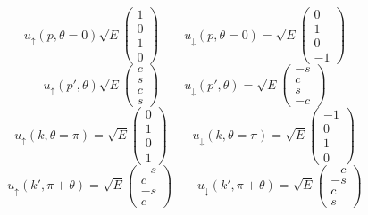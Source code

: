 \begin{equation} 
	u_\uparrow(p,\theta=0) \sqrt{E} \begin{pmatrix}
		1 \\ 0 \\ 1 \\ 0
	\end{pmatrix} \qquad 
	u_\downarrow(p,\theta=0)= \sqrt{E} \begin{pmatrix}
		0 \\ 1 \\ 0 \\ -1
	\end{pmatrix}
\end{equation}
\begin{equation} 
	u_\uparrow(p',\theta) \sqrt{E} \begin{pmatrix}
		c \\ s \\ c \\ s
	\end{pmatrix} \qquad 
	u_\downarrow(p',\theta)= \sqrt{E} \begin{pmatrix}
		-s \\ c \\ s \\ -c
	\end{pmatrix}
\end{equation}
\begin{equation}
	u_\uparrow(k,\theta=\pi) = \sqrt{E} \begin{pmatrix}
		0 \\ 1 \\ 0 \\ 1
	\end{pmatrix}  \qquad 
	u_\downarrow(k,\theta=\pi) = \sqrt{E} \begin{pmatrix}
		-1 \\ 0 \\ 1 \\ 0
	\end{pmatrix} 
\end{equation}
\begin{equation}
	u_\uparrow(k',\pi+\theta) = \sqrt{E} \begin{pmatrix}
		-s \\ c \\ -s \\ c
	\end{pmatrix}  \qquad 
	u_\downarrow(k',\pi + \theta) = \sqrt{E} \begin{pmatrix}
		-c \\ -s \\ c \\ s
	\end{pmatrix} 
\end{equation}

